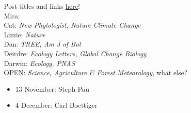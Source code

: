 \documentclass[11pt]{article}
\newenvironment{smitemize}{
\begin{itemize}
  \setlength{\itemsep}{0pt}
  \setlength{\parskip}{0.8pt}
  \setlength{\parsep}{0pt}}
{\end{itemize}
}
\begin{document}
 Post titles and links \href{https://docs.google.com/document/d/1j0WdDbjdp8ERLSO7whvtnP-tOblYMlX33TSCXy_uRKo/edit?usp=sharing}{\underline{here}}!\\
Mira: \\
Cat: \emph{New Phytologist, Nature Climate Change}\\
Lizzie: \emph{Nature}\\
Dan: \emph{TREE, Am J of Bot }\\
Deirdre: \emph{Ecology Letters, Global Change Biology}\\
Darwin: \emph{Ecology, PNAS}\\
OPEN: \emph{Science, Agriculture \& Forest Meteorology}, what else?\\

\begin{smitemize}
\item 13 November: Steph Pau
\item 4 December: Carl Boettiger
\end{smitemize}
\end{document}
